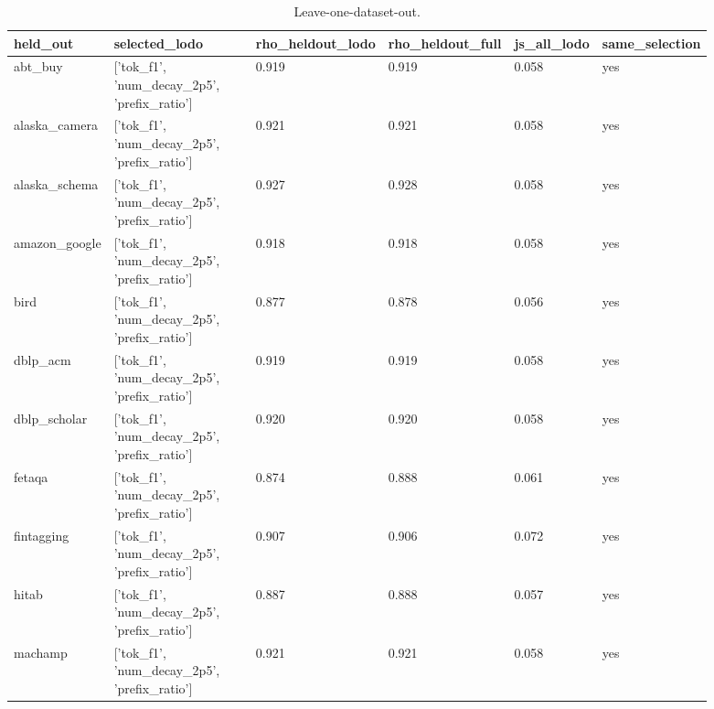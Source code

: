 \scriptsize
\setlength{\tabcolsep}{3pt}
\begin{longtable}{p{0.130\linewidth}p{0.364\linewidth}p{0.110\linewidth}p{0.110\linewidth}p{0.076\linewidth}p{0.096\linewidth}}
\caption{Leave-one-dataset-out.}\label{tab:lodo}\\
\toprule
held\_\allowbreak{}out & selected\_\allowbreak{}lodo & rho\_\allowbreak{}heldout\_\allowbreak{}lodo & rho\_\allowbreak{}heldout\_\allowbreak{}full & js\_\allowbreak{}all\_\allowbreak{}lodo & same\_\allowbreak{}selection \\
\midrule
abt\_\allowbreak{}buy & ['tok\_\allowbreak{}f1', 'num\_\allowbreak{}decay\_\allowbreak{}2p5', 'prefix\_\allowbreak{}ratio'] & 0.919 & 0.919 & 0.058 & yes \\
alaska\_\allowbreak{}camera & ['tok\_\allowbreak{}f1', 'num\_\allowbreak{}decay\_\allowbreak{}2p5', 'prefix\_\allowbreak{}ratio'] & 0.921 & 0.921 & 0.058 & yes \\
alaska\_\allowbreak{}schema & ['tok\_\allowbreak{}f1', 'num\_\allowbreak{}decay\_\allowbreak{}2p5', 'prefix\_\allowbreak{}ratio'] & 0.927 & 0.928 & 0.058 & yes \\
amazon\_\allowbreak{}google & ['tok\_\allowbreak{}f1', 'num\_\allowbreak{}decay\_\allowbreak{}2p5', 'prefix\_\allowbreak{}ratio'] & 0.918 & 0.918 & 0.058 & yes \\
bird & ['tok\_\allowbreak{}f1', 'num\_\allowbreak{}decay\_\allowbreak{}2p5', 'prefix\_\allowbreak{}ratio'] & 0.877 & 0.878 & 0.056 & yes \\
dblp\_\allowbreak{}acm & ['tok\_\allowbreak{}f1', 'num\_\allowbreak{}decay\_\allowbreak{}2p5', 'prefix\_\allowbreak{}ratio'] & 0.919 & 0.919 & 0.058 & yes \\
dblp\_\allowbreak{}scholar & ['tok\_\allowbreak{}f1', 'num\_\allowbreak{}decay\_\allowbreak{}2p5', 'prefix\_\allowbreak{}ratio'] & 0.920 & 0.920 & 0.058 & yes \\
fetaqa & ['tok\_\allowbreak{}f1', 'num\_\allowbreak{}decay\_\allowbreak{}2p5', 'prefix\_\allowbreak{}ratio'] & 0.874 & 0.888 & 0.061 & yes \\
fintagging & ['tok\_\allowbreak{}f1', 'num\_\allowbreak{}decay\_\allowbreak{}2p5', 'prefix\_\allowbreak{}ratio'] & 0.907 & 0.906 & 0.072 & yes \\
hitab & ['tok\_\allowbreak{}f1', 'num\_\allowbreak{}decay\_\allowbreak{}2p5', 'prefix\_\allowbreak{}ratio'] & 0.887 & 0.888 & 0.057 & yes \\
machamp & ['tok\_\allowbreak{}f1', 'num\_\allowbreak{}decay\_\allowbreak{}2p5', 'prefix\_\allowbreak{}ratio'] & 0.921 & 0.921 & 0.058 & yes \\

\end{longtable}
